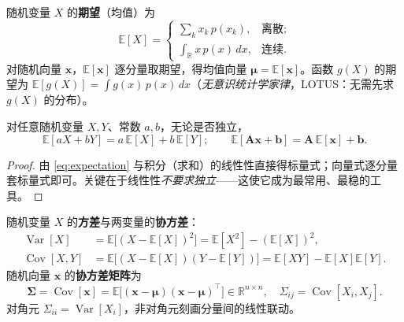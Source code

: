 \begin{definition}[期望]\label{def:expectation}
随机变量 $X$ 的\textbf{期望}（均值）为
\begin{equation}
  \mathbb{E}[X]=\begin{cases}\sum_k x_k\,p(x_k),&\text{离散};\\[2pt]\displaystyle\int_{\mathbb{R}}x\,p(x)\,dx,&\text{连续}.\end{cases}
  \label{eq:expectation}
\end{equation}
对随机向量 $\mathbf{x}$，$\mathbb{E}[\mathbf{x}]$ 逐分量取期望，得均值向量 $\boldsymbol{\mu}=\mathbb{E}[\mathbf{x}]$。函数 $g(X)$ 的期望为 $\mathbb{E}[g(X)]=\int g(x)\,p(x)\,dx$（\emph{无意识统计学家律}，LOTUS：无需先求 $g(X)$ 的分布）。
\end{definition}

\begin{theorem}[期望的线性性]\label{thm:linearity}
对任意随机变量 $X,Y$、常数 $a,b$，无论是否独立，
\begin{equation}
  \mathbb{E}[aX+bY]=a\,\mathbb{E}[X]+b\,\mathbb{E}[Y];\qquad
  \mathbb{E}[\mathbf{A}\mathbf{x}+\mathbf{b}]=\mathbf{A}\,\mathbb{E}[\mathbf{x}]+\mathbf{b}.
  \label{eq:linearity}
\end{equation}
\end{theorem}
\begin{proof}
由 \cref{eq:expectation} 与积分（求和）的线性性直接得标量式；向量式逐分量套标量式即可。关键在于线性性\emph{不要求独立}——这使它成为最常用、最稳的工具。
\end{proof}

\begin{definition}[方差、协方差与协方差矩阵]\label{def:covariance}
随机变量 $X$ 的\textbf{方差}与两变量的\textbf{协方差}：
\begin{align}
  \operatorname{Var}[X]&=\mathbb{E}\big[(X-\mathbb{E}[X])^2\big]=\mathbb{E}[X^2]-(\mathbb{E}[X])^2,\label{eq:variance}\\
  \operatorname{Cov}[X,Y]&=\mathbb{E}\big[(X-\mathbb{E}[X])(Y-\mathbb{E}[Y])\big]=\mathbb{E}[XY]-\mathbb{E}[X]\mathbb{E}[Y].\label{eq:cov}
\end{align}
随机向量 $\mathbf{x}$ 的\textbf{协方差矩阵}为
\begin{equation}
  \boldsymbol{\Sigma}=\operatorname{Cov}[\mathbf{x}]=\mathbb{E}\big[(\mathbf{x}-\boldsymbol{\mu})(\mathbf{x}-\boldsymbol{\mu})^\top\big]\in\mathbb{R}^{n\times n},
  \quad \Sigma_{ij}=\operatorname{Cov}[X_i,X_j].
  \label{eq:cov-matrix}
\end{equation}
对角元 $\Sigma_{ii}=\operatorname{Var}[X_i]$，非对角元刻画分量间的线性联动。
\end{definition}

